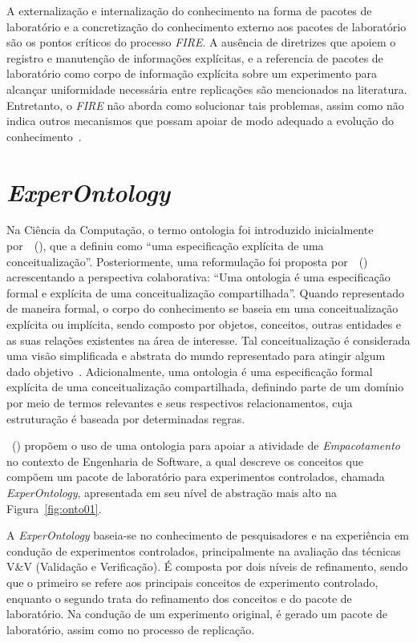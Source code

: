 A externalização e internalização do conhecimento na forma de pacotes de laboratório e a concretização do conhecimento externo aos pacotes de laboratório são os pontos críticos do processo \textit{FIRE}. A ausência de diretrizes que apoiem o registro e manutenção de informações explícitas, e a referencia de pacotes de laboratório como corpo de informação explícita sobre um experimento para alcançar uniformidade necessária entre replicações são mencionados na literatura. Entretanto, o \textit{FIRE} não aborda como solucionar tais problemas, assim como não indica outros mecanismos que possam apoiar de modo adequado a evolução do conhecimento~\cite{Garcia06}.


\section{\textit{ExperOntology}}
\label{exper}
Na Ciência da Computação, o termo ontologia foi introduzido inicialmente por~~(\citeyear{gruber1995toward}), que a definiu como ``uma especificação explícita de uma conceitualização''. Posteriormente, uma reformulação foi proposta por~~(\citeyear{borst1997construction}) acrescentando a perspectiva colaborativa: ``Uma ontologia é uma especificação formal e explícita de uma conceitualização compartilhada''. Quando representado de maneira formal, o corpo do conhecimento se baseia em uma conceitualização explícita ou implícita, sendo composto por objetos, conceitos, outras entidades e as suas relações existentes na área de interesse. Tal conceitualização é considerada uma visão simplificada e abstrata do mundo representado para atingir algum dado objetivo~\cite{rautenberg2016processo}. 
Adicionalmente, uma ontologia é uma especificação formal explícita de uma conceitualização compartilhada, definindo parte de um domínio por meio de termos relevantes e seus respectivos relacionamentos, cuja estruturação é baseada por determinadas regras. 


~(\citeyear{Garcia08}) propõem o uso de uma ontologia para apoiar a atividade de \textit{Empacotamento} no contexto de Engenharia de Software, a qual descreve os conceitos que compõem um pacote de laboratório para experimentos controlados, chamada \textit{ExperOntology}, apresentada em seu nível de abstração mais alto na Figura~\ref{fig:onto01}.


A \textit{ExperOntology} baseia-se no conhecimento de pesquisadores e na experiência em condução de experimentos controlados, principalmente na avaliação das técnicas V\&V (Validação e Verificação). É composta por dois níveis de refinamento, sendo que o primeiro se refere aos principais conceitos de experimento controlado, enquanto o segundo trata do refinamento dos conceitos e do pacote de laboratório. Na condução de um experimento original, é gerado um pacote de laboratório, assim como no processo de replicação.

